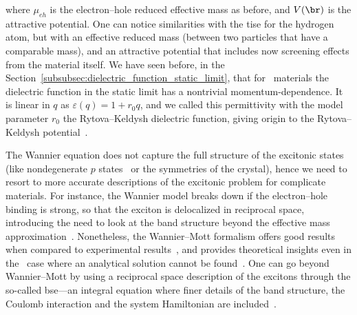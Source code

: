 \noindent where $\mu_{eh}$ is the electron--hole reduced effective mass as before, and $V(\br)$ is the attractive potential.
One can notice similarities with the \gls{tise} for the hydrogen atom, but with an effective reduced mass (between two particles that have a comparable mass), and an attractive potential that includes now screening effects from the material itself.
We have seen before, in the Section~\ref{subsubsec:dielectric_function_static_limit}, that for \bd~materials the dielectric function in the static limit has a nontrivial momentum-dependence.
It is linear in $q$ as $\varepsilon(q) = 1 + r_0 q$, and we called this permittivity with the model parameter $r_0$ the Rytova--Keldysh dielectric function, giving origin to the Rytova--Keldysh potential~\cite{keldysh2024coulomb}.

The Wannier equation does not capture the full structure of the excitonic states (like nondegenerate $p$ states~\cite{Olsen_Latini_Rasmussen_Thygesen_2016,PhysRevB.104.205201,PhysRevLett.115.166803} or the symmetries of the crystal), hence we need to resort to more accurate descriptions of the excitonic problem for complicate materials.
For instance, the Wannier model breaks down if the electron--hole binding is strong, so that the exciton is delocalized in reciprocal space, introducing the need to look at the band structure beyond the effective mass approximation~\cite{Cohen_Louie_2016}.
Nonetheless, the Wannier--Mott formalism offers good results when compared to experimental results~\cite{Catarina_Peres_2019}, and provides theoretical insights even in the \bd~case where an analytical solution cannot be found~\cite{Olsen_Latini_Rasmussen_Thygesen_2016}.
One can go beyond Wannier--Mott by using a reciprocal space description of the excitons through the so-called \gls{bse}---an integral equation where finer details of the band structure, the Coulomb interaction and the system Hamiltonian are included~\cite{Louie_2000,Mauricio_2022}.

